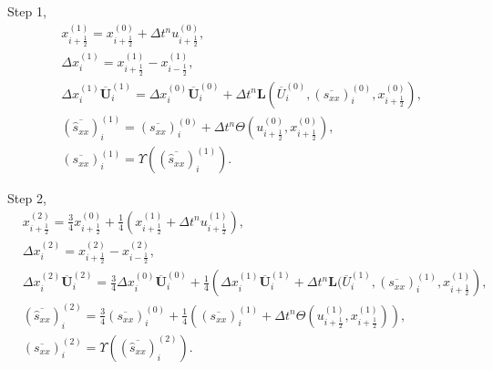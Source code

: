 \documentclass{article}
\numberwithin{equation}{section}
\numberwithin{table}{section}
\begin{document}
Step 1, 
\begin{equation}
  \begin{aligned}
	& x_{i+\frac{1}{2}}^{(1)} = x_{i+\frac{1}{2}}^{(0)}+\Delta t^n u_{i+\frac{1}{2}}^{(0)},\\
	& \Delta x_i^{(1)} =  x_{i+\frac{1}{2}}^{(1)}- x_{i-\frac{1}{2}}^{(1)},\\
    & \Delta x_i^{(1)} \overline{\bm{U}}_i^{(1)}= \Delta x_i^{(0)} \overline{\bm{U}}_i^{(0)}+\Delta t^n \bm{L}(\overline{U}_i^{(0)}, (\overline{s_{xx}})_i^{(0)}, x_{i+\frac{1}{2}}^{(0)}),\\
	& (\overline{\hat{s}_{xx}})_i^{(1)} = (\overline{s_{xx}})_i^{(0)} +\Delta t^ n  \varTheta (u_{i+\frac{1}{2}}^{(0)}, x_{i+\frac{1}{2}}^{(0)}),\\
  & (\overline{s_{xx}})_i^{(1)} = \Upsilon((\overline{\hat{s}_{xx}})_i^{(1)}).
\end{aligned}
\end{equation}


Step 2, 
\begin{equation}
  \begin{aligned}
	& x_{i+\frac{1}{2}}^{(2)} = \frac{3}{4} x_{i+\frac{1}{2}}^{(0)}+\frac{1}{4} \left( x_{i+\frac{1}{2}}^{(1)}+\Delta t^n u_{i+\frac{1}{2}}^{(1)}\right),\\
	& \Delta x_i^{(2)} =  x_{i+\frac{1}{2}}^{(2)}- x_{i-\frac{1}{2}}^{(2)},\\
	& \Delta x_i^{(2)} \overline{\bm{U}}_i^{(2)}  = \frac{3}{4} \Delta x_i^{(0)} \overline{\bm{U}}_i^{(0)}+ \frac{1}{4} \left(  \Delta x_i^{(1)} \overline{\bm{U}}_i^{(1)} + \Delta t^n \bm{L}(\overline{U}_i^{(1)}, (\overline{s_{xx}})_i^{(1)}, x_{i+\frac{1}{2}}^{(1)}\right),\\
	& (\overline{\hat{s}_{xx}})_i^{(2)} =\frac{3}{4} (\overline{s_{xx}})_i^{(0)} + \frac{1}{4} \left(  (\overline{s_{xx}})_i^{(1)}+\Delta t^ n \varTheta (u_{i+\frac{1}{2}}^{(1)}, x_{i+\frac{1}{2}}^{(1)})\right),\\
  & (\overline{s_{xx}})_i^{(2)} = \Upsilon((\overline{\hat{s}_{xx}})_i^{(2)}).
\end{aligned}
\end{equation}
\end{document}
